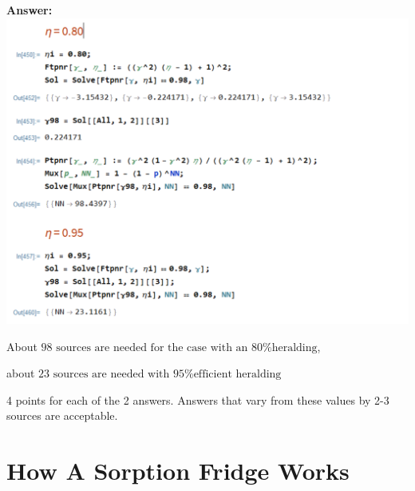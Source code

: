 \documentclass[12pt]{caltech_thesis}
\begin{document}
\begin{enumerate}
  {\color{midnightblue}  \textbf{Answer:} }
  {\color{midnightblue} \includegraphics{chapter_05/figs_05/pnrTotalPerf.PNG}}

  {\color{midnightblue} About
  \(\boxed{\text{98 sources are needed for the case with an 80\% heralding}}\),
  }

  {\color{midnightblue} about
  \(\boxed{\text{23 sources are needed with 95\% efficient heralding}}\)}

  {\color{darkred}  4 points for each of the 2 answers. Answers that
  vary from these values by 2-3 sources are acceptable. }
\end{enumerate}

\hypertarget{how-a-sorption-fridge-works}{%
\section{How A Sorption Fridge
Works}\label{how-a-sorption-fridge-works}}

\printbibliography
\end{document}
